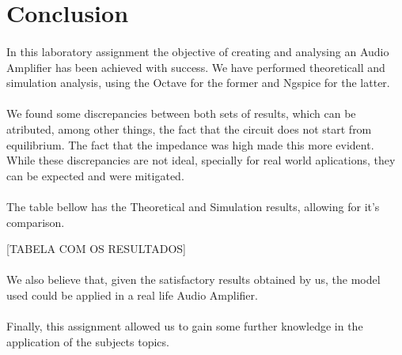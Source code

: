 \section{Conclusion}
\label{sec:conclusion}

\paragraph{} In this laboratory assignment the objective of creating and analysing an Audio Amplifier has been achieved with success. 
We have performed theoreticall and simulation analysis, using the Octave for the former and Ngspice for the latter.

\paragraph{} We found some discrepancies between both sets of results, which can be atributed, among other things, the fact that the circuit 
does not start from equilibrium. The fact that the impedance was high made this more evident. While these discrepancies are not ideal, specially 
for real world aplications, they can be expected and were mitigated.

\paragraph{} The table bellow has the Theoretical and Simulation results, allowing for it's comparison.

[TABELA COM OS RESULTADOS]

\paragraph{} We also believe that, given the satisfactory results obtained by us, the model used could be applied in a real life Audio Amplifier.

\paragraph{} Finally, this assignment allowed us to gain some further knowledge in the application of the subjects topics.







